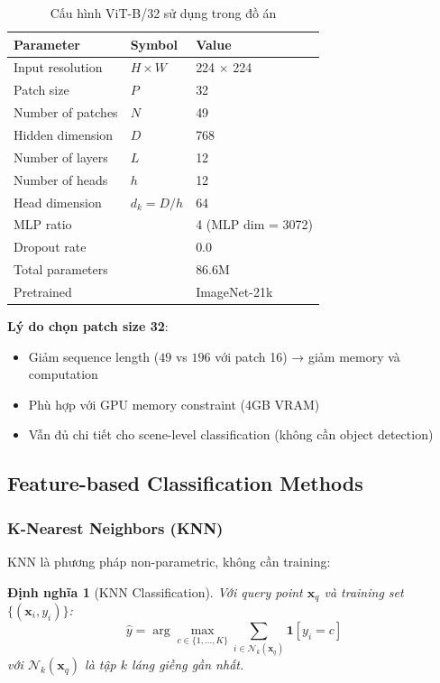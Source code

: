 \documentclass[12pt,a4paper]{article}
\newtheorem{definition}{Định nghĩa}[section]
\begin{document}
\begin{table}[H]
\centering
\caption{Cấu hình ViT-B/32 sử dụng trong đồ án}
\label{tab:vit_config}
\begin{tabular}{lll}
\toprule
\textbf{Parameter} & \textbf{Symbol} & \textbf{Value} \\
\midrule
Input resolution & $H \times W$ & 224 × 224 \\
Patch size & $P$ & 32 \\
Number of patches & $N$ & 49 \\
Hidden dimension & $D$ & 768 \\
Number of layers & $L$ & 12 \\
Number of heads & $h$ & 12 \\
Head dimension & $d_k = D/h$ & 64 \\
MLP ratio & & 4 (MLP dim = 3072) \\
Dropout rate & & 0.0 \\
Total parameters & & 86.6M \\
Pretrained & & ImageNet-21k \\
\bottomrule
\end{tabular}
\end{table}

\textbf{Lý do chọn patch size 32}:
\begin{itemize}
    \item Giảm sequence length ($49$ vs $196$ với patch 16) → giảm memory và computation
    \item Phù hợp với GPU memory constraint (4GB VRAM)
    \item Vẫn đủ chi tiết cho scene-level classification (không cần object detection)
\end{itemize}

\subsection{Feature-based Classification Methods}

\subsubsection{K-Nearest Neighbors (KNN)}

KNN là phương pháp non-parametric, không cần training:

\begin{definition}[KNN Classification]
Với query point $\mathbf{x}_q$ và training set $\{(\mathbf{x}_i, y_i)\}$:
\begin{equation}
    \hat{y} = \arg\max_{c \in \{1,...,K\}} \sum_{i \in \mathcal{N}_k(\mathbf{x}_q)} \mathbf{1}[y_i = c]
\end{equation}
với $\mathcal{N}_k(\mathbf{x}_q)$ là tập $k$ láng giềng gần nhất.
\end{definition}
\end{document}
